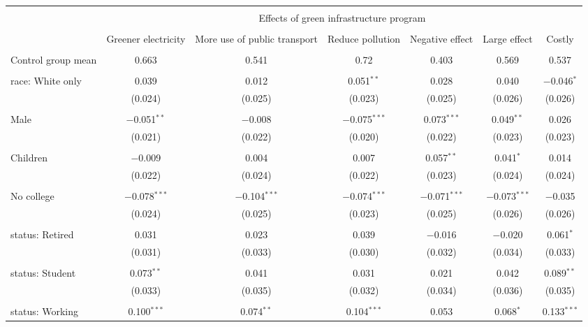 
\begin{tabular}{@{\extracolsep{5pt}}lcccccc} 
\\[-1.8ex]\hline 
\hline \\[-1.8ex] 
 & \multicolumn{6}{c}{Effects of green infrastructure program} \\ 
\cline{2-7} 
\\[-1.8ex] & Greener electricity & More use of public transport & Reduce pollution & Negative effect & Large effect & Costly \\ 
\hline \\[-1.8ex] 
 Control group mean & 0.663 & 0.541 & 0.72 & 0.403 & 0.569 & 0.537  \\ \hline \\[-1.8ex] race: White only & 0.039 & 0.012 & 0.051$^{**}$ & 0.028 & 0.040 & $-$0.046$^{*}$ \\ 
  & (0.024) & (0.025) & (0.023) & (0.025) & (0.026) & (0.026) \\ 
  & & & & & & \\ 
 Male & $-$0.051$^{**}$ & $-$0.008 & $-$0.075$^{***}$ & 0.073$^{***}$ & 0.049$^{**}$ & 0.026 \\ 
  & (0.021) & (0.022) & (0.020) & (0.022) & (0.023) & (0.023) \\ 
  & & & & & & \\ 
 Children & $-$0.009 & 0.004 & 0.007 & 0.057$^{**}$ & 0.041$^{*}$ & 0.014 \\ 
  & (0.022) & (0.024) & (0.022) & (0.023) & (0.024) & (0.024) \\ 
  & & & & & & \\ 
 No college & $-$0.078$^{***}$ & $-$0.104$^{***}$ & $-$0.074$^{***}$ & $-$0.071$^{***}$ & $-$0.073$^{***}$ & $-$0.035 \\ 
  & (0.024) & (0.025) & (0.023) & (0.025) & (0.026) & (0.026) \\ 
  & & & & & & \\ 
 status: Retired & 0.031 & 0.023 & 0.039 & $-$0.016 & $-$0.020 & 0.061$^{*}$ \\ 
  & (0.031) & (0.033) & (0.030) & (0.032) & (0.034) & (0.033) \\ 
  & & & & & & \\ 
 status: Student & 0.073$^{**}$ & 0.041 & 0.031 & 0.021 & 0.042 & 0.089$^{**}$ \\ 
  & (0.033) & (0.035) & (0.032) & (0.034) & (0.036) & (0.035) \\ 
  & & & & & & \\ 
 status: Working & 0.100$^{***}$ & 0.074$^{**}$ & 0.104$^{***}$ & 0.053 & 0.068$^{*}$ & 0.133$^{***}$ \\ 

\end{tabular}

